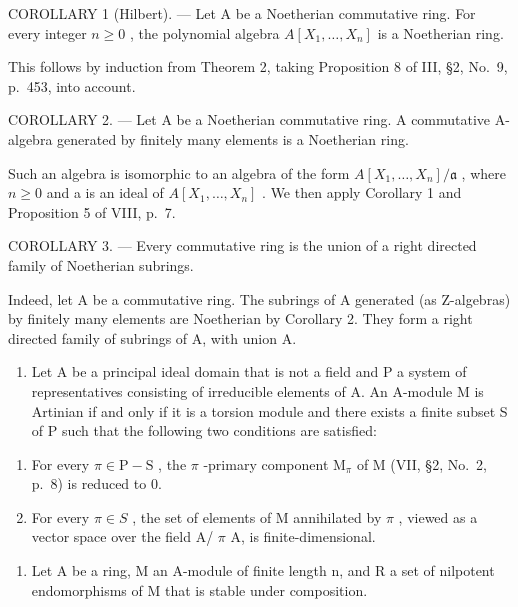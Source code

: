 COROLLARY 1 (Hilbert). --- Let A be a Noetherian commutative ring. For every integer \(n \geqslant 0\) , the polynomial algebra \(A[X_{1}, \ldots, X_{n}]\) is a Noetherian ring.

This follows by induction from Theorem 2, taking Proposition 8 of III, §2, No.~9, p.~453, into account.

COROLLARY 2. --- Let A be a Noetherian commutative ring. A commutative A-algebra generated by finitely many elements is a Noetherian ring.

Such an algebra is isomorphic to an algebra of the form \(A[X_{1},\ldots,X_{n}]/\mathfrak{a}\) , where \(n \geqslant 0\) and a is an ideal of \(A[X_{1},\ldots,X_{n}]\) . We then apply Corollary 1 and Proposition 5 of VIII, p.~7.

COROLLARY 3. --- Every commutative ring is the union of a right directed family of Noetherian subrings.

Indeed, let A be a commutative ring. The subrings of A generated (as Z-algebras) by finitely many elements are Noetherian by Corollary 2. They form a right directed family of subrings of A, with union A.


\begin{enumerate}
\def\labelenumi{\arabic{enumi})}
\tightlist
\item
  Let A be a principal ideal domain that is not a field and P a system of representatives consisting of irreducible elements of A. An A-module M is Artinian if and only if it is a torsion module and there exists a finite subset S of P such that the following two conditions are satisfied:
\end{enumerate}

\begin{enumerate}
\def\labelenumi{(\roman{enumi})}
\item
  For every \(\pi \in \mathrm{P} - \mathrm{S}\) , the \(\pi\) -primary component \(\mathrm{M}_{\pi}\) of \(\mathrm{M}\) (VII, §2, No.~2, p.~8) is reduced to 0.
\item
  For every \(\pi\in S\) , the set of elements of M annihilated by \(\pi\) , viewed as a vector space over the field A/ \(\pi\) A, is finite-dimensional.
\end{enumerate}

\begin{enumerate}
\def\labelenumi{\arabic{enumi})}
\setcounter{enumi}{1}
\tightlist
\item
  Let A be a ring, M an A-module of finite length n, and R a set of nilpotent endomorphisms of M that is stable under composition.
\end{enumerate}

